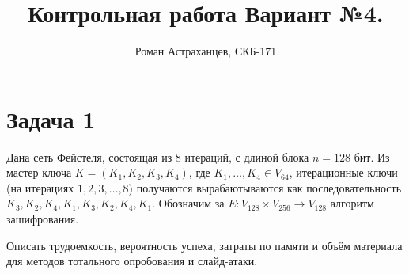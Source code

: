 \documentclass[a4paper,12pt]{article}
\title{Контрольная работа \linebreak Вариант №4.}
\author{Роман Астраханцев, СКБ-171}
\theoremstyle{definition}
\begin{document}
	\maketitle
	
	\section*{Задача 1}
	Дана сеть Фейстеля, состоящая из 8 итераций, с длиной блока $n=128$ бит.
	Из мастер ключа $K=(K_1, K_2, K_3, K_4)$, где $K_1, \dots, K_4 \in V_{64}$, итерационные ключи (на итерациях $1, 2, 3, \dots, 8$) получаются вырабаютываются как последовательность $K_3, K_2, K_4, K_1, K_3, K_2, K_4, K_1$. Обозначим за $E: V_{128} \times V_{256} \rightarrow V_{128}$ алгоритм зашифрования.
	
	Описать трудоемкость, вероятность успеха, затраты по памяти и объём материала для методов тотального опробования и слайд-атаки.
		
\end{document}
